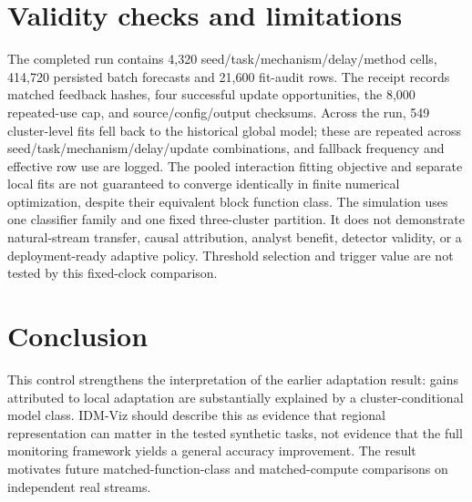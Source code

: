 \documentclass[10pt]{article}
\begin{document}
\section{Validity checks and limitations}
The completed run contains 4,320 seed/task/mechanism/delay/method cells, 414,720 persisted batch forecasts and 21,600 fit-audit rows. The receipt records matched feedback hashes, four successful update opportunities, the 8,000 repeated-use cap, and source/config/output checksums. Across the run, 549 cluster-level fits fell back to the historical global model; these are repeated across seed/task/mechanism/delay/update combinations, and fallback frequency and effective row use are logged. The pooled interaction fitting objective and separate local fits are not guaranteed to converge identically in finite numerical optimization, despite their equivalent block function class. The simulation uses one classifier family and one fixed three-cluster partition. It does not demonstrate natural-stream transfer, causal attribution, analyst benefit, detector validity, or a deployment-ready adaptive policy. Threshold selection and trigger value are not tested by this fixed-clock comparison.
\section{Conclusion}
This control strengthens the interpretation of the earlier adaptation result: gains attributed to local adaptation are substantially explained by a cluster-conditional model class. IDM-Viz should describe this as evidence that regional representation can matter in the tested synthetic tasks, not evidence that the full monitoring framework yields a general accuracy improvement. The result motivates future matched-function-class and matched-compute comparisons on independent real streams.
\end{document}
